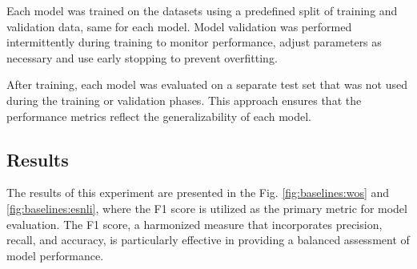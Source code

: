 \begin{table}[h]
    \centering
    \caption{Number of samples in each dataset portion}
    \label{tab:dataset_portions}
\end{table}

Each model was trained on the datasets using a predefined split of training and validation data, same for each model. Model validation was performed intermittently during training to monitor performance, adjust parameters as necessary and use early stopping to prevent overfitting.

After training, each model was evaluated on a separate test set that was not used during the training or validation phases. This approach ensures that the performance metrics reflect the generalizability of each model.

\subsection*{Results}

The results of this experiment are presented in the Fig. \ref{fig:baselines:wos} and \ref{fig:baselines:esnli}, where the F1 score is utilized as the primary metric for model evaluation. The F1 score, a harmonized measure that incorporates precision, recall, and accuracy, is particularly effective in providing a balanced assessment of model performance.

